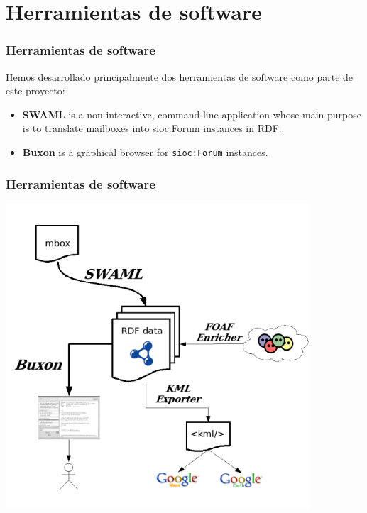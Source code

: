 \documentclass[spanish,notes=hide]{beamer}
\begin{document}
\section{Herramientas de software}
\frame
{
  \frametitle{Herramientas de software}

  Hemos desarrollado principalmente dos herramientas de software como parte
  de este proyecto:
  \vspace{0.5cm}
  \begin{itemize}
    \item<2->	\begin{Large}\textbf{SWAM}L is a non-interactive, 
		command-line application whose main purpose is to 
		translate mailboxes into sioc:Forum instances in 
		RDF.\end{Large}
    \vspace{0.5cm}
    \item<3->	\begin{Large}\textbf{Buxon} is a graphical browser 
		for \texttt{sioc:Forum} instances.\end{Large}
  \end{itemize}
}
\frame
{
  \frametitle{Herramientas de software}

  \begin{center}
    \includegraphics[width=0.85\textwidth]{images/swaml-tools.png}
  \end{center}
}
\frame
\end{document}
